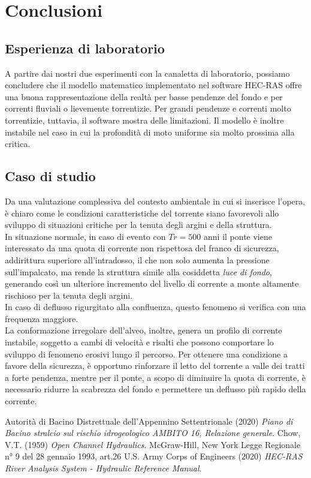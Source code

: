 \documentclass[12pt]{article} %
\begin{document}
\newpage
\section{Conclusioni}

\subsection{Esperienza di laboratorio}

\noindent A partire dai nostri due esperimenti con la canaletta di laboratorio, possiamo concludere che il modello matematico implementato nel software HEC-RAS offre una buona rappresentazione della realtà per basse pendenze del fondo e per correnti fluviali o lievemente torrentizie. Per grandi pendenze e correnti molto torrentizie, tuttavia, il software mostra delle limitazioni. Il modello è inoltre instabile nel caso in cui la profondità di moto uniforme sia molto prossima alla critica.

\subsection{Caso di studio}

\noindent Da una valutazione complessiva del contesto ambientale in cui si inserisce l'opera, è chiaro come le condizioni caratteristiche del torrente siano favorevoli allo sviluppo di situazioni critiche per la tenuta degli argini e della struttura.\\
In situazione normale, in caso di evento con $Tr=500$ anni il ponte viene interessato da una quota di corrente non rispettosa del franco di sicurezza, addirittura superiore all'intradosso, il che non solo aumenta la pressione sull'impalcato, ma rende la struttura simile alla cosiddetta \textit{luce di fondo}, generando così un ulteriore incremento del livello di corrente a monte altamente rischioso per la tenuta degli argini.\\
In caso di deflusso rigurgitato alla confluenza, questo fenomeno si verifica con una frequenza maggiore.\\
La conformazione irregolare dell'alveo, inoltre, genera un profilo di corrente instabile, soggetto a cambi di velocità e risalti che possono comportare lo sviluppo di fenomeno erosivi lungo il percorso.
Per ottenere una condizione a favore della sicurezza, è opportuno rinforzare il letto del torrente a valle dei tratti a forte pendenza, mentre per il ponte, a scopo di diminuire la quota di corrente, è necessario ridurre la scabrezza del fondo e permettere un deflusso più rapido della corrente.

\newpage
\begin{thebibliography}{}
 Autorità di Bacino Distrettuale dell'Appennino Settentrionale (2020) \textit{Piano di Bacino stralcio sul rischio idrogeologico AMBITO 16, Relazione generale}.
Chow, V.T. (1959) \textit{Open Channel Hydraulics}. McGraw-Hill, New York
 Legge Regionale n° 9 del 28 gennaio 1993, art.26
U.S. Army Corps of Engineers (2020) \textit{HEC-RAS River Analysis System - Hydraulic Reference Manual}. 
\end{thebibliography}
\end{document}
